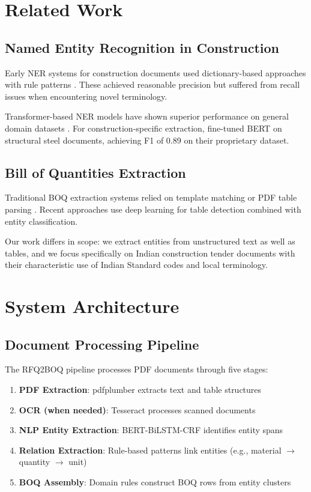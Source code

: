 \documentclass[pdftex,11pt]{article}
\begin{document}
\section{Related Work}

\subsection{Named Entity Recognition in Construction}
Early NER systems for construction documents used dictionary-based approaches with rule patterns \citep{rulebased2005}. These achieved reasonable precision but suffered from recall issues when encountering novel terminology.

Transformer-based NER models have shown superior performance on general domain datasets \citep{devlin2019bert}. For construction-specific extraction, \citet{constructionbert2022} fine-tuned BERT on structural steel documents, achieving F1 of 0.89 on their proprietary dataset.

\subsection{Bill of Quantities Extraction}
Traditional BOQ extraction systems relied on template matching \citep{template2008} or PDF table parsing \citep{pdfmining2015}. Recent approaches use deep learning for table detection \citep{tableformer2022} combined with entity classification.

Our work differs in scope: we extract entities from unstructured text as well as tables, and we focus specifically on Indian construction tender documents with their characteristic use of Indian Standard codes and local terminology.

\section{System Architecture}

\subsection{Document Processing Pipeline}

The RFQ2BOQ pipeline processes PDF documents through five stages:

\begin{enumerate}
    \item \textbf{PDF Extraction}: pdfplumber extracts text and table structures
    \item \textbf{OCR (when needed)}: Tesseract processes scanned documents
    \item \textbf{NLP Entity Extraction}: BERT-BiLSTM-CRF identifies entity spans
    \item \textbf{Relation Extraction}: Rule-based patterns link entities (e.g., material $\rightarrow$ quantity $\rightarrow$ unit)
    \item \textbf{BOQ Assembly}: Domain rules construct BOQ rows from entity clusters
\end{enumerate}
\end{document}
